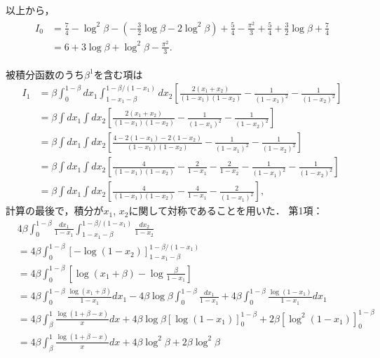 以上から，
\begin{align}
  \begin{split}
    I_0 &= \frac{7}{4} - \log^2 \beta
    - \left( - \frac{3}{2} \log\beta - 2 \log^2 \beta \right)
    +\frac{5}{4} - \frac{\pi^2}{3}
    + \frac{5}{4} + \frac{3}{2} \log\beta
    + \frac{7}{4}
    \\
    &= 6 + 3\log\beta + \log^2 \beta - \frac{\pi^2}{3} .
  \end{split}
  \label{FP1_I_d_0}
\end{align}

被積分函数のうち$\beta^1$を含む項は
\begin{align*}
  I_1 &= \beta \int_0^{1-\beta} dx_1 \int_{1-x_1-\beta}^{1-\beta/(1-x_1)} dx_2
  \left[ \frac{2(x_1+x_2)}{(1-x_1)(1-x_2)} - \frac{1}{(1-x_1)^2} - \frac{1}{(1-x_2)^2} \right] \\
  &= \beta \int dx_1 \int dx_2 \left[ \frac{2(x_1+x_2)}{(1-x_1)(1-x_2)} - \frac{1}{(1-x_1)^2} - \frac{1}{(1-x_2)^2} \right] \\
  &= \beta \int dx_1 \int dx_2 \left[ \frac{4 - 2(1-x_1) - 2(1-x_2)}{(1-x_1)(1-x_2)} - \frac{1}{(1-x_1)^2} - \frac{1}{(1-x_2)^2} \right] \\
  &= \beta \int dx_1 \int dx_2 \left[ \frac{4}{(1-x_1)(1-x_2)} - \frac{2}{1-x_1} - \frac{2}{1-x_2} - \frac{1}{(1-x_1)^2} - \frac{1}{(1-x_2)^2} \right] \\
  &= \beta \int dx_1 \int dx_2 \left[ \frac{4}{(1-x_1)(1-x_2)} - \frac{4}{1-x_1} - \frac{2}{(1-x_1)^2} \right] ,
\end{align*}
計算の最後で，積分が$x_1$, $x_2$に関して対称であることを用いた．
第1項：
\begin{align*}
  & 4\beta \int_0^{1-\beta} \frac{dx_1}{1-x_1} \int_{1-x_1-\beta}^{1-\beta/(1-x_1)} \frac{dx_2}{1-x_2} \\
  &= 4\beta \int_0^{1-\beta} \left[ - \log (1-x_2) \right]_{1-x_1-\beta}^{1-\beta/(1-x_1)} \\
  &= 4\beta \int_0^{1-\beta} \left[ \log (x_1 + \beta) - \log \frac{\beta}{1-x_1} \right] \\
  &= 4\beta \int_0^{1-\beta} \frac{\log(x_1+\beta)}{1-x_1} dx_1
  - 4\beta\log\beta \int_0^{1-\beta} \frac{dx_1}{1-x_1}
  + 4\beta \int_0^{1-\beta} \frac{\log(1-x_1)}{1-x_1} dx_1 \\
  &= 4\beta \int_\beta^1 \frac{\log(1+\beta-x)}{x} dx
  + 4\beta\log\beta \left[ \log(1-x_1) \right]_0^{1-\beta}
  + 2\beta \left[ \log^2 (1-x_1) \right]_0^{1-\beta} \\
  &= 4\beta \int_\beta^1 \frac{\log(1+\beta-x)}{x} dx
  + 4\beta\log^2\beta
  + 2\beta\log^2\beta
\end{align*}
